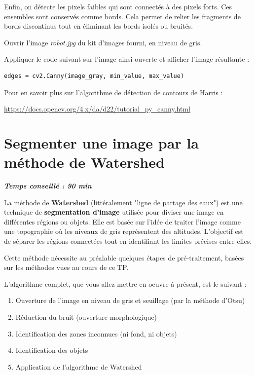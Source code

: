 \documentclass[a4paper,11pt,titlepage]{article} %
\begin{document}
Enfin, on détecte les pixels faibles qui sont connectés à des pixels forts. Ces ensembles sont conservés comme bords. Cela permet de relier les fragments de bords discontinus tout en éliminant les bords isolés ou bruités.

\medskip

\Manip Ouvrir l'image \textsl{robot.jpg} du kit d'images fourni, en niveau de gris. 

\Manip Appliquer le code suivant sur l'image ainsi ouverte et afficher l'image résultante :

\begin{lstlisting}
edges = cv2.Canny(image_gray, min_value, max_value)
\end{lstlisting}

\medskip

Pour en savoir plus sur l'algorithme de détection de contours de Harris : 

\href{https://docs.opencv.org/4.x/da/d22/tutorial_py_canny.html}{https://docs.opencv.org/4.x/da/d22/tutorial\_py\_canny.html} 


\newpage
\section{Segmenter une image par la méthode de Watershed}

\begin{center} \textbf{\textit{Temps conseillé : 90 min}} \end{center}

La méthode de \textbf{Watershed} (littéralement "ligne de partage des eaux") est une technique de \textbf{segmentation d'image} utilisée pour diviser une image en différentes régions ou objets. Elle est basée sur l'idée de traiter l'image comme une topographie où les niveaux de gris représentent des altitudes. L'objectif est de séparer les régions connectées tout en identifiant les limites précises entre elles.

Cette méthode nécessite au préalable quelques étapes de pré-traitement, basées sur les méthodes vues au cours de ce TP. 

L'algorithme complet, que vous allez mettre en oeuvre à présent, est le suivant :

\begin{enumerate}
	\item Ouverture de l'image en niveau de gris et seuillage (par la méthode d'Otsu)
	\item Réduction du bruit (ouverture morphologique)
	\item Identification des zones inconnues (ni fond, ni objets)
	\item Identification des objets	
	\item Application de l'algorithme de Watershed
\end{enumerate}
\end{document}
